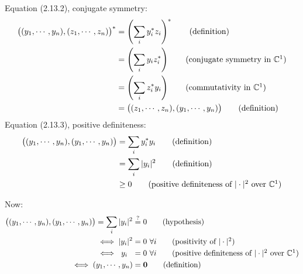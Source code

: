 Equation (2.13.2), conjugate symmetry:
\begin{align}
	\bigl((y_1, \cdots, y_n), (z_1, \cdots, z_n)\bigr)^*
	&= \left(\sum_i y_i^* z_i \right)^* \tag{definition}\\
	&= \left(\sum_i y_i  z_i^* \right) \tag{conjugate symmetry in $\mathbb{C}^1$}\\
	&= \left(\sum_i z_i^* y_i \right) \tag{commutativity in $\mathbb{C}^1$}\\
	&= \bigl((z_1, \cdots, z_n) , (y_1, \cdots, y_n)\bigr) \tag{definition}
\end{align}
Equation (2.13.3), positive definiteness:
\begin{align*}
	\bigl((y_1, \cdots, y_n), (y_1, \cdots, y_n)\bigr)
	&= \sum_i y_i^* y_i \tag{definition}\\
	&= \sum_i |y_i|^2 \tag{definition} \\
	&\geq 0 \tag{positive definiteness of $|\cdot|^2$ over $\mathbb{C}^1$}
\end{align*}

Now:
\begin{align*}
	\bigl((y_1, \cdots, y_n), (y_1, \cdots, y_n)\bigr) = \sum_i |y_i|^2 &\stackrel{?}{=} 0 \tag{hypothesis}\\ \iff |y_i|^2 &= 0\  \forall i \tag{positivity of $|\cdot|^2$}\\ \iff \ y_i\ \  &= 0\  \forall i \tag{positive definiteness of $|\cdot|^2$ over $\mathbb{C}^1$}\\ \iff (y_1, \cdots, y_n) &=  \textbf{0} \tag{definition}
\end{align*}
%
%


